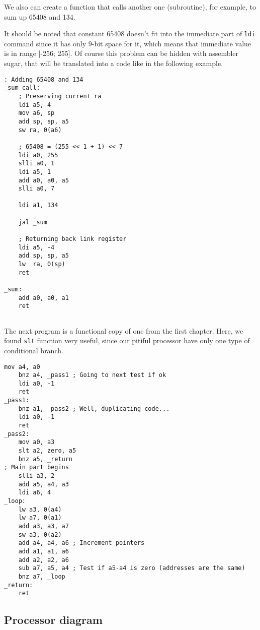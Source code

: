 \documentclass[a4paper]{article}
\begin{document}
We also can create a function that calls another one (subroutine), for example, to sum up 65408 and 134.

It should be noted that constant 65408 doesn't fit into the immediate part of \texttt{ldi} command since it has only 9-bit space for it, which means that immediate value is in range [-256; 255]. Of course this problem can be hidden with assembler sugar, that will be translated into a code like in the following example.

\begin{lstlisting}[language={[x86masm]Assembler}, caption=Sum function call]
: Adding 65408 and 134
_sum_call:
    ; Preserving current ra
    ldi a5, 4
    mov a6, sp
    add sp, sp, a5
    sw ra, 0(a6)
    
    ; 65408 = (255 << 1 + 1) << 7
    ldi a0, 255
    slli a0, 1
    ldi a5, 1
    add a0, a0, a5
    slli a0, 7
    
    ldi a1, 134
    
    jal _sum
    
    ; Returning back link register
    ldi a5, -4
    add sp, sp, a5
    lw  ra, 0(sp)
    ret
    
_sum:
    add a0, a0, a1
    ret
   
\end{lstlisting}

The next program is a functional copy of one from the first chapter. Here, we found \texttt{slt} function very useful, since our pitiful processor have only one type of conditional branch.

\begin{lstlisting}[language={[x86masm]Assembler}, caption=Sum function from chapter 2]
    mov a4, a0
    bnz a4, _pass1 ; Going to next test if ok
    ldi a0, -1
    ret
_pass1:
    bnz a1, _pass2 ; Well, duplicating code...
    ldi a0, -1
    ret
_pass2:
    mov a0, a3
    slt a2, zero, a5
    bnz a5, _return
; Main part begins
    slli a3, 2
    add a5, a4, a3
    ldi a6, 4
_loop:
    lw a3, 0(a4)
    lw a7, 0(a1)
    add a3, a3, a7
    sw a3, 0(a2)
    add a4, a4, a6 ; Increment pointers
    add a1, a1, a6
    add a2, a2, a6
    sub a7, a5, a4 ; Test if a5-a4 is zero (addresses are the same)
    bnz a7, _loop
_return:
    ret
\end{lstlisting}

\subsection{Processor diagram}
\end{document}
